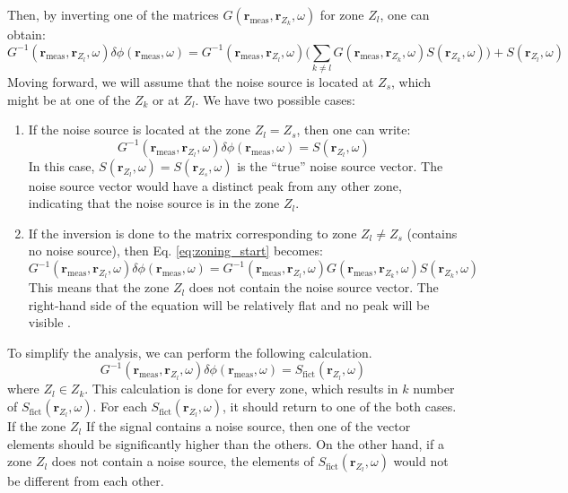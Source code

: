 Then, by inverting one of the matrices $G(\textbf{r}_{\text{meas}}, \textbf{r}_{Z_k},\omega)$ for zone $Z_l$, one can obtain:
\begin{equation}\label{eq:zoning_start}
    G^{-1}(\textbf{r}_{\text{meas}}, \textbf{r}_{Z_l},\omega) \delta \phi (\textbf{r}_{\text{meas}}, \omega) = G^{-1}(\textbf{r}_{\text{meas}}, \textbf{r}_{Z_l},\omega) \biggl( \sum_{k \neq l} G(\textbf{r}_{\text{meas}}, \textbf{r}_{Z_k},\omega) S(\textbf{r}_{Z_k},\omega) \biggr) + S(\textbf{r}_{Z_l},\omega)
\end{equation}
Moving forward, we will assume that the noise source is located at $Z_s$, which might be at one of the $Z_k$ or at $Z_l$. We have two possible cases:
\begin{enumerate}
    \item If the noise source is located at the zone $Z_l=Z_s$, then one can write:
    \begin{equation}
        G^{-1}(\textbf{r}_{\text{meas}}, \textbf{r}_{Z_l},\omega) \delta \phi (\textbf{r}_{\text{meas}}, \omega) =  S(\textbf{r}_{Z_l},\omega)
    \end{equation}
    In this case, $S(\textbf{r}_{Z_l},\omega)= S(\textbf{r}_{Z_s},\omega)$ is the “true” noise source vector. The noise source vector would have a distinct peak from any other zone, indicating that the noise source is in the zone $Z_l$.
    \item If the inversion is done to the matrix corresponding to zone $Z_l \neq Z_s$ (contains no noise source), then Eq. \ref{eq:zoning_start} becomes:
    \begin{equation}
        G^{-1}(\textbf{r}_{\text{meas}}, \textbf{r}_{Z_l},\omega) \delta \phi (\textbf{r}_{\text{meas}}, \omega) = G^{-1}(\textbf{r}_{\text{meas}}, \textbf{r}_{Z_l},\omega) G(\textbf{r}_{\text{meas}}, \textbf{r}_{Z_k},\omega) S(\textbf{r}_{Z_k},\omega)
    \end{equation}
    This means that the zone $Z_l$ does not contain the noise source vector. The right-hand side of the equation will be relatively flat and no peak will be visible \cite{demaziereIdentificationLocalizationAbsorbers2005}.
\end{enumerate}

To simplify the analysis, we can perform the following calculation.
\begin{equation}
    G^{-1}(\textbf{r}_{\text{meas}}, \textbf{r}_{Z_l},\omega) \delta \phi (\textbf{r}_{\text{meas}}, \omega) =  S_{\text{fict}}(\textbf{r}_{Z_l},\omega)
\end{equation}
where $Z_l \in Z_k$. This calculation is done for every zone, which results in $k$ number of $S_{\text{fict}}(\textbf{r}_{Z_l},\omega)$. For each $S_{\text{fict}}(\textbf{r}_{Z_l},\omega)$, it should return to one of the both cases. If the zone $Z_l$ If the signal contains a noise source, then one of the vector elements should be significantly higher than the others. On the other hand, if a zone $Z_l$ does not contain a noise source, the elements of $S_{\text{fict}}(\textbf{r}_{Z_l},\omega)$ would not be different from each other.

